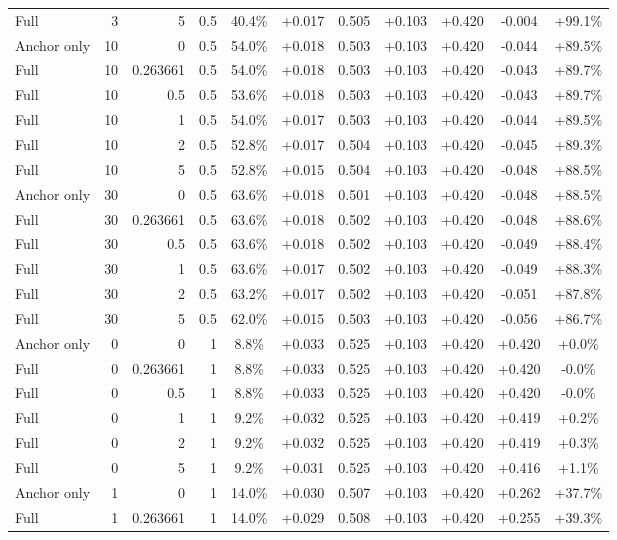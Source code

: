\begin{table}[htbp]
\begin{tabular}{lrrrccccccc}
Full & 3 & 5 & 0.5 & 40.4\% & +0.017 & 0.505 & +0.103 & +0.420 & -0.004 & +99.1\% \\
Anchor only & 10 & 0 & 0.5 & 54.0\% & +0.018 & 0.503 & +0.103 & +0.420 & -0.044 & +89.5\% \\
Full & 10 & 0.263661 & 0.5 & 54.0\% & +0.018 & 0.503 & +0.103 & +0.420 & -0.043 & +89.7\% \\
Full & 10 & 0.5 & 0.5 & 53.6\% & +0.018 & 0.503 & +0.103 & +0.420 & -0.043 & +89.7\% \\
Full & 10 & 1 & 0.5 & 54.0\% & +0.017 & 0.503 & +0.103 & +0.420 & -0.044 & +89.5\% \\
Full & 10 & 2 & 0.5 & 52.8\% & +0.017 & 0.504 & +0.103 & +0.420 & -0.045 & +89.3\% \\
Full & 10 & 5 & 0.5 & 52.8\% & +0.015 & 0.504 & +0.103 & +0.420 & -0.048 & +88.5\% \\
Anchor only & 30 & 0 & 0.5 & 63.6\% & +0.018 & 0.501 & +0.103 & +0.420 & -0.048 & +88.5\% \\
Full & 30 & 0.263661 & 0.5 & 63.6\% & +0.018 & 0.502 & +0.103 & +0.420 & -0.048 & +88.6\% \\
Full & 30 & 0.5 & 0.5 & 63.6\% & +0.018 & 0.502 & +0.103 & +0.420 & -0.049 & +88.4\% \\
Full & 30 & 1 & 0.5 & 63.6\% & +0.017 & 0.502 & +0.103 & +0.420 & -0.049 & +88.3\% \\
Full & 30 & 2 & 0.5 & 63.2\% & +0.017 & 0.502 & +0.103 & +0.420 & -0.051 & +87.8\% \\
Full & 30 & 5 & 0.5 & 62.0\% & +0.015 & 0.503 & +0.103 & +0.420 & -0.056 & +86.7\% \\
Anchor only & 0 & 0 & 1 & 8.8\% & +0.033 & 0.525 & +0.103 & +0.420 & +0.420 & +0.0\% \\
Full & 0 & 0.263661 & 1 & 8.8\% & +0.033 & 0.525 & +0.103 & +0.420 & +0.420 & -0.0\% \\
Full & 0 & 0.5 & 1 & 8.8\% & +0.033 & 0.525 & +0.103 & +0.420 & +0.420 & -0.0\% \\
Full & 0 & 1 & 1 & 9.2\% & +0.032 & 0.525 & +0.103 & +0.420 & +0.419 & +0.2\% \\
Full & 0 & 2 & 1 & 9.2\% & +0.032 & 0.525 & +0.103 & +0.420 & +0.419 & +0.3\% \\
Full & 0 & 5 & 1 & 9.2\% & +0.031 & 0.525 & +0.103 & +0.420 & +0.416 & +1.1\% \\
Anchor only & 1 & 0 & 1 & 14.0\% & +0.030 & 0.507 & +0.103 & +0.420 & +0.262 & +37.7\% \\
Full & 1 & 0.263661 & 1 & 14.0\% & +0.029 & 0.508 & +0.103 & +0.420 & +0.255 & +39.3\% \\

\end{tabular}
\end{table}
